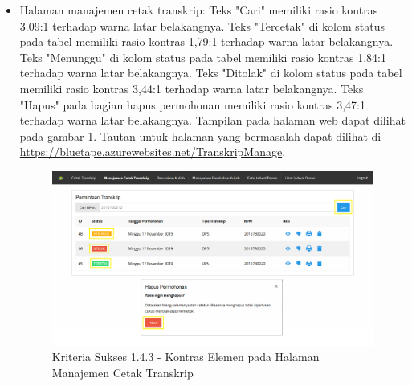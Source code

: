 \documentclass[a4paper,twoside]{article}
\begin{document}
\begin{enumerate}
\begin{itemize}
			\item Halaman manajemen cetak transkrip: Teks "Cari" memiliki rasio kontras 3.09:1 terhadap warna latar belakangnya. Teks "Tercetak" di kolom status pada tabel memiliki rasio kontras 1,79:1 terhadap warna latar belakangnya. Teks "Menunggu" di kolom status pada tabel memiliki rasio kontras 1,84:1 terhadap warna latar belakangnya. Teks "Ditolak" di kolom status pada tabel memiliki rasio kontras 3,44:1 terhadap warna latar belakangnya. Teks "Hapus" pada bagian hapus permohonan memiliki rasio kontras 3,47:1 terhadap warna latar belakangnya. Tampilan pada halaman web dapat dilihat pada gambar \ref{fig:1.4.3_contrast_minimum_3}. Tautan untuk halaman yang bermasalah dapat dilihat di \url{https://bluetape.azurewebsites.net/TranskripManage}.
			\begin{figure}[H]
				\centering  
				\includegraphics[scale=0.3, frame]{kriteria-sukses-1-4-3-contrast-minimum-3}  
				\caption[Kriteria Sukses 1.4.3 - Kontras Elemen pada Halaman Manajemen Cetak Transkrip]{Kriteria Sukses 1.4.3 - Kontras Elemen pada Halaman Manajemen Cetak Transkrip}
				\label{fig:1.4.3_contrast_minimum_3}  
			\end{figure} 
			

\end{itemize}
\end{enumerate}
\end{document}
